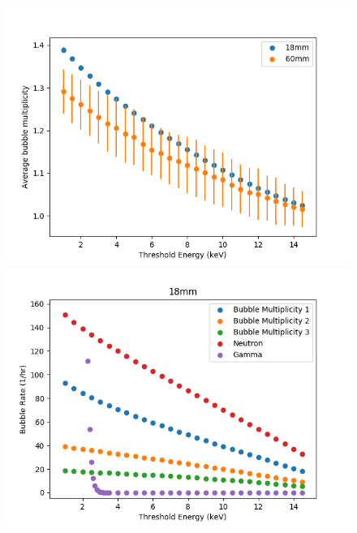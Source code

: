\documentclass[%
12pt,
twoside,
reprint,
amsmath,amssymb,
aps,
]{article}
\begin{document}
	\begin{figure}[!t]
		\begin{minipage}{0.5\textwidth}
			\centering
			\includegraphics[width=1.1\linewidth]{Images/bubble_mult.png}
		\end{minipage}
		\begin{minipage}{0.5\textwidth}
			\centering
			\includegraphics[width=1.1\linewidth]{Images/18mm_thresh.png}
		\end{minipage}
		\caption{\label{tab:table-name}}
	\end{figure}
\end{document}
